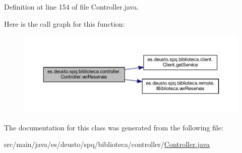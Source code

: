 Definition at line 154 of file Controller.\+java.

Here is the call graph for this function\+:
\nopagebreak
\begin{figure}[H]
\begin{center}
\leavevmode
\includegraphics[width=350pt]{classes_1_1deusto_1_1spq_1_1biblioteca_1_1controller_1_1_controller_aaf010f5a789f146044b4a68a55d8003b_cgraph}
\end{center}
\end{figure}


The documentation for this class was generated from the following file\+:\begin{DoxyCompactItemize}
\item 
src/main/java/es/deusto/spq/biblioteca/controller/\mbox{\hyperlink{_controller_8java}{Controller.\+java}}\end{DoxyCompactItemize}
